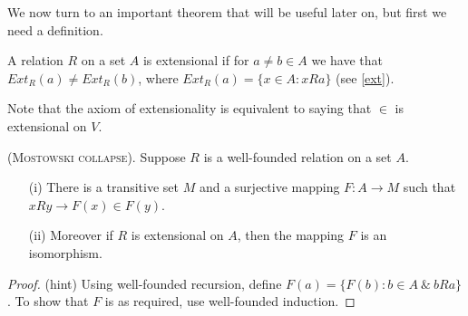We now turn to an important theorem that will be useful later on, but first we need a definition.

\begin{definition}
A relation $R$ on a set $A$ is extensional if for $a\neq b\in A$ we have that $Ext_R(a)\neq Ext_R(b)$, where
$Ext_R(a)=\{x\in A: xRa\}$ (see \ref{ext}).
\end{definition}

Note that the axiom of extensionality is equivalent to saying that $\in$ is extensional on $V$.

\begin{theorem}\label{mostowski}
{\scshape (Mostowski collapse).} Suppose $R$ is a well-founded
relation on a set $A$.
\begin{itemize}
\item[(i)] There is a transitive set $M$ and a surjective mapping $F:A\to M$ such that $xRy\rightarrow F(x)\in F(y)$.
\item[(ii)] Moreover if $R$ is extensional on $A$, then the mapping $F$ is an isomorphism.
\end{itemize}
\end{theorem}

\begin{proof}
(hint) Using well-founded recursion, define $F(a)=\{F(b):b\in A\ \&\ bRa\}$. To show that $F$ is as required, use well-founded induction.
\end{proof}

%



